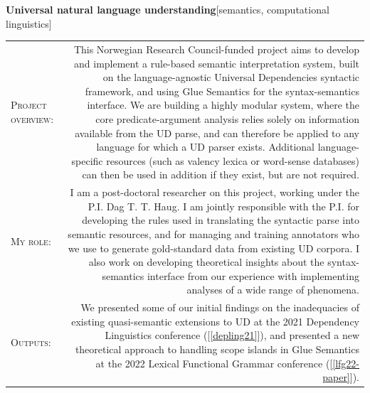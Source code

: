 \documentclass[11pt,a4paper]{article}
\makeatletter
\newlength{\rulelength}%
\newcommand{\REx}[2]{%
\vspace*{0.1\baselineskip}%
{\large\textbf{#1}\hfill\textnormal{[#2]}}%
\vspace*{0.5\baselineskip}%
}
\newenvironment{cvsection}{%
  \setlength{\extrarowheight}{0.70ex}
  \begin{longtable}[l]{@{} L R @{}}
}{%
  \end{longtable}
}
\newcommand{\sref}[1]{[\ref{#1}]}
\newcommand{\researchsubhead}[1]{%
\textsc{#1}:%
}
\makeatother
\begin{document}
\REx{Universal natural language understanding}{semantics, computational
  linguistics}
\begin{cvsection}
  \researchsubhead{Project overview} &%
  This Norwegian Research Council-funded project aims to develop and implement a
  rule-based semantic interpretation system, built on the language-agnostic
  Universal Dependencies syntactic framework, and using Glue Semantics for the
  syntax-semantics interface. We are building a highly modular system, where the
  core predicate-argument analysis relies solely on information available from
  the UD parse, and can therefore be applied to any language for which a UD
  parser exists. Additional language-specific resources (such as valency lexica
  or word-sense databases) can then be used in addition if they exist, but are
  not required.
  \\
  \researchsubhead{My role} &%
  I am a post-doctoral researcher on this project, working under the P.I. Dag T.
  T. Haug. I am jointly responsible with the P.I. for developing the rules used
  in translating the syntactic parse into semantic resources, and for managing
  and training annotators who we use to generate gold-standard data from
  existing UD corpora. I also work on developing theoretical insights about the
  syntax-semantics interface from our experience with implementing analyses of a
  wide range of phenomena.
  \\
  \researchsubhead{Outputs} &%
  We presented some of our initial findings on the inadequacies of existing
  quasi-semantic extensions to UD at the 2021 Dependency Linguistics conference
  (\sref{depling21}), and presented a new theoretical approach to handling scope
  islands in Glue Semantics at the 2022 Lexical Functional Grammar conference
  (\sref{lfg22-paper}).
\end{cvsection}
\end{document}
